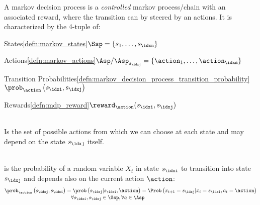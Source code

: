 \begin{defnbox}\nospacing
  \begin{defn}\label{defn:markov_decision_process_mdp}
    A markov decision process is a \textit{controlled} markov process/chain with an associated reward,
    where the transition can by steered by an actions.
    It is characterized by the 4-tuple of:
    \begin{circlelistnosep}
      \item States\cref{defn:markov_states}\hfill$\Ssp=\left\{s_{1},\ldots,s_{\idxn}\right\}$
      \item Actions\cref{defn:markov_actions}\hfill$\Asp/\Asp_{s_{\idxj}}=\left\{\action_{1},\ldots,\action_{\idxm}\right\}$
      \item Transition Probabilities\cref{defn:markov_decision_process_transition_probability}\hfill$\prob_{\action}\left(s_{\idxi},s_{\idxj}\right)$
      \item Rewards\cref{defn:mdp_reward}\hfill$\reward_{\action}(s_{\idxi},s_{\idxj})$
    \end{circlelistnosep}
  \end{defn}
\end{defnbox}
\begin{defnbox}\nospacing
  \begin{defn}[\newline Actions\hfill\tc{black}{$\Asp_{s_{\idxi}}=\left\{\action_{1},\ldots,\action_{\idxm}\right\}$}]\label{defn:markov_actions}\leavevmode\\
    Is the set of possible actions from which we can choose at each state and
    may depend on the state $s_{\idxj}$ itself.
  \end{defn}
\end{defnbox}
\begin{defnbox}\nospacing
  \begin{defn}\label{defn:markov_decision_process_transition_probability}\leavevmode\\
    is the probability of a random variable $X_{t}$ in state $s_{\idxi}$ to transition into state $s_{\idxj}$ and depends also
    on the current action $\action$:
    \begin{align}
      \prob_{\action}\left(s_{\idxj},s_{\idxi}\right)&=\prob\left(s_{\idxj}|s_{\idxi},\action\right)
                                                =\Prob\left(x_{t+1}=s_{\idxj}|x_{t}=s_{\idxi},a_{t}=\action\right)\nonumber\\[-1\jot]
      &\begin{aligned}
          &&\forall s_{\idxi},s_{\idxj}\in\Ssp, \forall a\in\Asp
      \end{aligned}
      \label{eq:transition_probability_mdp}
    \end{align}
  \end{defn}
\end{defnbox}
